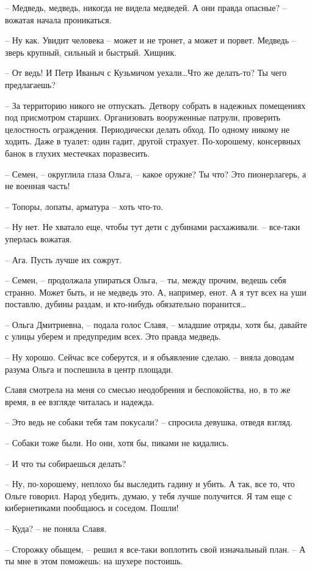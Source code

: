 \documentclass[a4paper]{book}
\begin{document}
-- Медведь, медведь, никогда не видела медведей. А они правда опасные? -- вожатая начала проникаться.

-- Ну как. Увидит человека -- может и не тронет, а может и порвет. Медведь -- зверь крупный, сильный и быстрый. Хищник.

-- От ведь! И Петр Иваныч с Кузьмичом уехали\ldots Что же делать-то? Ты чего предлагаешь?

-- За территорию никого не отпускать. Детвору собрать в надежных помещениях под присмотром старших.  Организовать вооруженные патрули, проверить целостность ограждения. Периодически делать обход. По одному никому не ходить. Даже в туалет: один гадит, другой страхует. По-хорошему, консервных банок в глухих местечках поразвесить.

-- Семен, -- округлила глаза Ольга, -- какое оружие? Ты что? Это пионерлагерь, а не военная часть!

-- Топоры, лопаты, арматура -- хоть что-то. 

-- Ну нет. Не хватало еще, чтобы тут дети с дубинами расхаживали. -- все-таки уперлась вожатая. 

-- Ага. Пусть лучше их сожрут.

-- Семен, -- продолжала упираться Ольга, -- ты, между прочим, ведешь себя странно. Может быть, и не медведь это. А, например, енот. А я тут всех на уши поставлю, дубины раздам, и кто-нибудь обязательно поранится\ldots

-- Ольга Дмитриевна, -- подала голос Славя, -- младшие отряды, хотя бы, давайте с улицы уберем и предупредим всех. Это правда медведь.

-- Ну хорошо. Сейчас все соберутся, и я объявление сделаю. -- вняла доводам разума Ольга и поспешила в центр площади.

Славя смотрела на меня со смесью неодобрения и беспокойства, но, в то же время, в ее взгляде читалась и надежда. 

-- Это ведь не собаки тебя там покусали? -- спросила девушка, отведя взгляд. 

-- Собаки тоже были. Но они, хотя бы, пиками не кидались.

-- И что ты собираешься делать?

-- Ну, по-хорошему, неплохо бы выследить гадину и убить. А так, все то, что Ольге говорил. Народ убедить, думаю, у тебя лучше получится. Я там еще с кибернетиками пообщаюсь и соседом. Пошли!

-- Куда? -- не поняла Славя.

-- Сторожку обыщем, -- решил я все-таки воплотить свой изначальный план. -- А ты мне в этом поможешь: на шухере постоишь.
\end{document}
